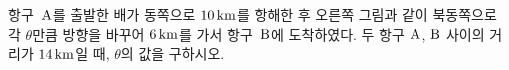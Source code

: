 \noindent\begin{minipage}[t]{0.58\linewidth}\vspace{0pt}\raggedright 항구~$\mathrm{A}$를 출발한 배가 동쪽으로 $10\mkern3mu \mathrm{km}$를 항해한 후 오른쪽 그림과 같이 북동쪽으로 각 $\theta$만큼 방향을 바꾸어 $6\mkern3mu \mathrm{km}$를 가서 항구~$\mathrm{B}$에 도착하였다. 두 항구 $\mathrm{A}$, $\mathrm{B}$ 사이의 거리가 $14\mkern3mu \mathrm{km}$일 때, $\theta$의 값을 구하시오.\end{minipage}\hfill\begin{minipage}[t]{0.4\linewidth}\vspace{0pt}\centering \resizebox{\ifdim\width>\linewidth\linewidth\else\width\fi}{!}{}\end{minipage}\par
